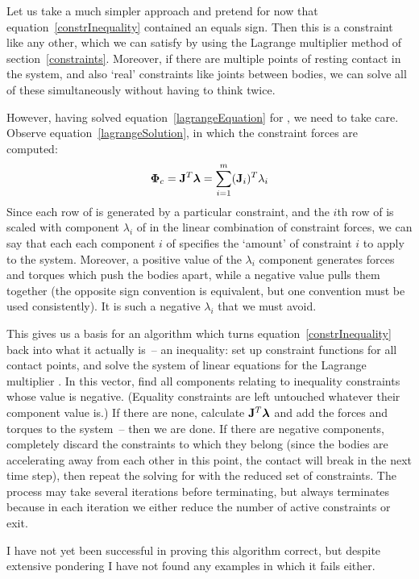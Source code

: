 Let us take a much simpler approach and pretend for now that equation~\ref{constrInequality}
contained an equals sign. Then this is a constraint like any other, which we can satisfy by using
the Lagrange multiplier method of section~\ref{constraints}. Moreover, if there are multiple
points of resting contact in the system, and also `real' constraints like joints between bodies,
we can solve all of these simultaneously without having to think twice.

However, having solved equation~\ref{lagrangeEquation} for \ve{\lambda}, we need to take care.
Observe equation~\ref{lagrangeSolution}, in which the constraint forces are computed:
\begin{equation}
\ve{\Phi}_c = \m{J}^T\ve{\lambda} = \sum_{i=1}^{m} (\ve{J}_i)^T \lambda_i
\end{equation}
Since each row of  is generated by a particular constraint, and the $i$th row of  is
scaled with component $\lambda_i$ of \ve{\lambda} in the linear combination of constraint forces,
we can say that each each component $i$ of \ve{\lambda} specifies the `amount' of constraint $i$
to apply to the system. Moreover, a positive value of the $\lambda_i$ component generates
forces and torques which push the bodies apart, while a negative value pulls them together (the
opposite sign convention is equivalent, but one convention must be used consistently). It is such
a negative $\lambda_i$ that we must avoid.

This gives us a basis for an algorithm which turns equation~\ref{constrInequality} back into what
it actually is~-- an inequality: set up constraint functions for all contact points, and solve the
system of linear equations for the Lagrange multiplier \ve{\lambda}. In this vector, find all
components relating to inequality constraints whose value is negative. (Equality constraints
are left untouched whatever their \ve{\lambda} component value is.)
If there are none, calculate $\m{J}^T\ve{\lambda}$ and add the forces and torques to the system~--
then we are done. If there are negative components, completely discard the constraints to which
they belong (since the bodies are accelerating away from each other in this point, the contact
will break in the next time step), then repeat the solving for \ve{\lambda} with the reduced set
of constraints. The process may take several iterations before terminating, but always terminates
because in each iteration we either reduce the number of active constraints or exit.

I have not yet been successful in proving this algorithm correct, but despite extensive pondering
I have not found any examples in which it fails either.

